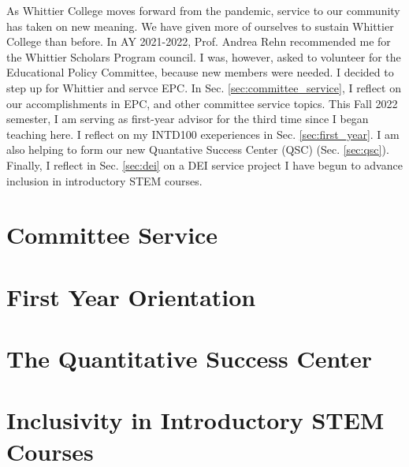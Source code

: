 \documentclass[../../main.tex]{subfiles}
\begin{document}
\label{sec:service}

As Whittier College moves forward from the pandemic, service to our community has taken on new meaning.  We have given more of ourselves to sustain Whittier College than before.  In AY 2021-2022, Prof. Andrea Rehn recommended me for the Whittier Scholars Program council.  I was, however, asked to volunteer for the Educational Policy Committee, because new members were needed.  I decided to step up for Whittier and servce EPC.  In Sec. \ref{sec:committee_service}, I reflect on our accomplishments in EPC, and other committee service topics.  This Fall 2022 semester, I am serving as first-year advisor for the third time since I began teaching here.  I reflect on my INTD100 exeperiences in Sec. \ref{sec:first_year}.  I am also helping to form our new Quantative Success Center (QSC) (Sec. \ref{sec:qsc}).  Finally, I reflect in Sec. \ref{sec:dei} on a DEI service project I have begun to advance inclusion in introductory STEM courses.

\section{Committee Service}

\begin{flushleft}

\end{flushleft}

\section{First Year Orientation}

\begin{flushleft}

\end{flushleft}

\section{The Quantitative Success Center}

\begin{flushleft}

\end{flushleft}

\section{Inclusivity in Introductory STEM Courses}

\begin{flushleft}

\end{flushleft}
\end{document}
